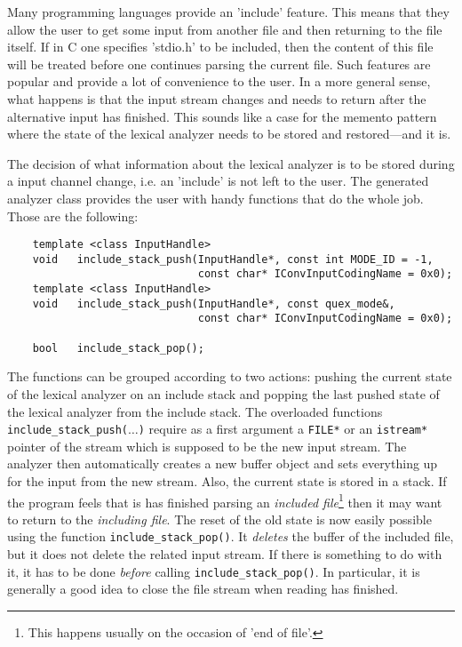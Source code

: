 Many programming languages provide an 'include' feature. This means that they
allow the user to get some input from another file and then returning to the
file itself. If in C one specifies 'stdio.h' to be included, then the content
of this file will be treated before one continues parsing the current file.
Such features are popular and provide a lot of convenience to the user. In a
more general sense, what happens is that the input stream changes and needs to
return after the alternative input has finished. This sounds like a case for
the memento pattern \cite{} where the state of the lexical analyzer needs to be
stored and restored---and it is.

The decision of what information about the lexical analyzer is to be stored
during a input channel change, i.e. an 'include' is not left to the user. The
generated analyzer class provides the user with handy functions that do the
whole job. Those are the following:

\begin{lstlisting}
	template <class InputHandle> 
	void   include_stack_push(InputHandle*, const int MODE_ID = -1, 
                              const char* IConvInputCodingName = 0x0);
	template <class InputHandle> 
	void   include_stack_push(InputHandle*, const quex_mode&,
                              const char* IConvInputCodingName = 0x0);

	bool   include_stack_pop();
\end{lstlisting}

The functions can be grouped according to two actions: pushing the current state
of the lexical analyzer on an include stack and popping the last pushed state
of the lexical analyzer from the include stack. The overloaded functions
{\tt include\_stack\_push($\ldots$)} require as a first argument a {\tt FILE*}
or an {\tt istream*} pointer of the stream which is supposed to be the new
input stream. The analyzer then automatically creates a new buffer object and
sets everything up for the input from the new stream. Also, the current
state is stored in a stack. If the program feels that is has finished parsing 
an {\it included file}\footnote{This happens usually on the occasion of 'end of file'.}
then it may want to return to the {\it including file}. The reset of the old 
state is now easily possible using the function {\tt include\_stack\_pop()}. 
It {\it deletes} the buffer of the included file, but it does not delete
the related input stream. If there is something to do with it, it has to be done
{\it before} calling {\tt include\_stack\_pop()}. In particular, it 
is generally a good idea to close the file stream when reading has finished.

